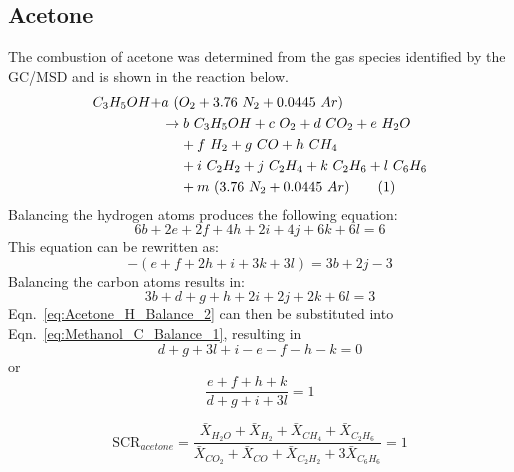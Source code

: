 \documentclass[12pt]{article}
\newcommand\numberthis{\addtocounter{equation}{1}\tag{\theequation}}
\begin{document}
\subsection{Acetone}
\label{ssec:Acetone_SCR}
The combustion of acetone was determined from the gas species identified by the GC/MSD and is shown in the reaction below.
\begin{align*}
C_{3}H_{5}OH+&a~(O_{2}+3.76~N_{2}+0.0445~Ar)\\
&\rightarrow b~C_{3}H_{5}OH+c~O_{2}+ d~CO_{2}+e~H_{2}O\\
&~~~~+f~H_{2}+ g~CO+h~CH_{4}\\
&~~~~+ i~C_{2}H_{2}+j~C_{2}H_{4}+k~C_{2}H_{6}+l~C_{6}H_{6}\\
&~~~~+m~(3.76~N_{2}+0.0445~Ar) \numberthis \label{eq:Ethanol_rxn}
\end{align*}
Balancing the hydrogen atoms produces the following equation:
\begin{equation}
\label{eq:Acetone_H_Balance_1}
6b+2e+2f+4h+2i+4j+6k+6l=6
\end{equation}
This equation can be rewritten as:
\begin{equation}
\label{eq:Acetone_H_Balance_2}
-\left(e+f+2h+i+3k+3l\right)=3b+2j-3
\end{equation}
Balancing the carbon atoms results in:
\begin{equation}
\label{eq:Acetone_C_Balance_1}
3b+d+g+h+2i+2j+2k+6l=3
\end{equation}
Eqn.~\ref{eq:Acetone_H_Balance_2} can then be substituted into Eqn.~\ref{eq:Methanol_C_Balance_1}, resulting in
\begin{equation}
\label{eq:Acetone_C_Balance_2}
d+g+3l+i-e-f-h-k=0
\end{equation}
or
\begin{equation}
\label{eq:Acetone_SCR}
\frac{e+f+h+k}{d+g+i+3l}=1
\end{equation}

\begin{equation}\label{eq:prod_ratio_acetone}
\text{SCR}_{acetone}=\frac{\bar{X}_{H_2O}+\bar{X}_{H_2}+\bar{X}_{CH_4}+\bar{X}_{C_2H_6}}{\bar{X}_{CO_2}+\bar{X}_{CO}+\bar{X}_{C_2H_2}+3\bar{X}_{C_6H_6}}=1
\end{equation}

\pagebreak
\end{document}
